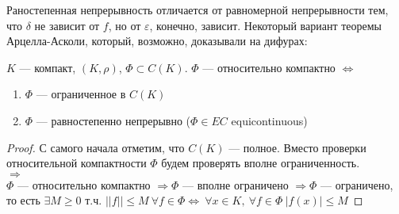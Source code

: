 \documentclass[document]{subfiles}
\begin{document}
Раностепенная непрерывность отличается от равномерной непрерывности тем, что $\delta$ не зависит от $f$, но от $\varepsilon$, конечно, зависит.
Некоторый вариант теоремы Арцелла-Асколи, который, возможно, доказывали на дифурах:
\begin{theorem}
    $K$ --- компакт, $(K, \rho)$, $\Phi \subset C(K)$. $\Phi$ --- относительно компактно $\Leftrightarrow$ 
    \begin{enumerate}
        \item $\Phi$ --- ограниченное в $C(K)$ 
        \item $\Phi$ --- равностепенно непрерывно ($\Phi \in EC$ equicontinuous)
    \end{enumerate}
    
\end{theorem}
\begin{proof}
    С самого начала отметим, что $C(K)$ --- полное. Вместо проверки относительной компактности $\Phi$ будем проверять вполне ограниченность.\\
    $\Rightarrow$ \\
    $\Phi$ --- относительно компактно $\Rightarrow \Phi$ --- вполне ограничено $\Rightarrow \Phi$ --- ограничено, то есть 
    $\exists M \geq 0$ т.ч. $||f|| \leq M \: \forall f \in \Phi \Leftrightarrow \: \forall x \in K, \: \forall f \in \Phi \: |f(x)| \leq M$


\end{proof}
\end{document}
